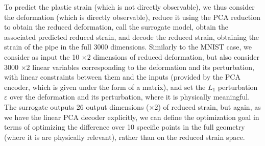 To predict the plastic strain (which is not directly observable), we thus consider the deformation (which is directly observable), reduce it using the PCA reduction to obtain the reduced deformation, call the surrogate model, obtain the associated predicted reduced strain, and decode the reduced strain, obtaining the strain of the pipe in the full 3000 dimensions. Similarly to the MNIST case, we consider as input the 10 $\times 2$ dimensions of reduced deformation, but also consider 3000 $\times 2$ linear variables corresponding to the deformation and its perturbation, with linear constraints between them and the inputs (provided by the PCA encoder, which is given under the form of a matrix), and set the $L_1$ perturbation $\varepsilon$ over the deformation and its perturbation, where it is physically meaningful.
The surrogate outputs 26 output dimensions ($\times 2$) of reduced strain, but again, as we have the linear PCA decoder explicitly, we can define the optimization goal in terms of optimizing the difference over 10 specific points in the full geometry (where it is are physically relevant), rather than on the reduced strain space.

\newpage

